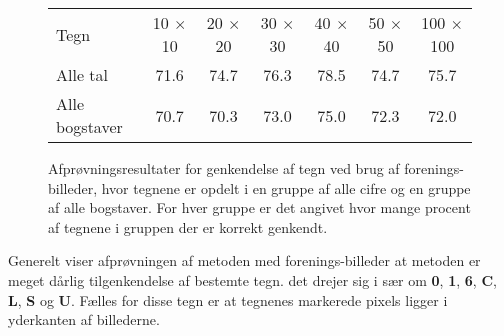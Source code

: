 \begin{figure}[htp]
\centering
\begin{tabular}{|l|c|c|c|c|c|c|}\hline
\rowcolor[gray]{0.9} \multicolumn{7}{|>{\columncolor[gray]{0.9}}c|}{\textbf{Forenings-billeder}} \\ \hline
Tegn & 10 $\times$ 10 & 20 $\times$ 20 & 30 $\times$ 30 & 40 $\times$ 40 & 50 $\times$ 50 & 100 $\times$ 100\\\hline
Alle tal & 71.6 & 74.7 & 76.3 & 78.5 & 74.7 & 75.7\\\hline
Alle bogstaver & 70.7 & 70.3 & 73.0 & 75.0 & 72.3 & 72.0\\\hline
\end{tabular}
\caption{Afprøvningsresultater for genkendelse af tegn ved brug af forenings-billeder, hvor tegnene er opdelt i en gruppe af alle cifre og en gruppe af alle bogstaver. For hver gruppe er det angivet hvor mange procent af tegnene i gruppen der er korrekt genkendt.}
\label{fig:test:and_alletegn}
\end{figure}

Generelt viser afprøvningen af metoden med forenings-billeder at metoden er meget dårlig tilgenkendelse af bestemte tegn. det drejer sig i sær om \textbf{0}, \textbf{1}, \textbf{6}, \textbf{C}, \textbf{L}, \textbf{S} og \textbf{U}. Fælles for disse tegn er at tegnenes markerede pixels ligger i yderkanten af billederne.


\begin{comment}

\begin{figure}[htp]
\centering
\begin{tabular}{|l|c|c|}\hline
\rowcolor[gray]{0.9} \multicolumn{3}{|>{\columncolor[gray]{0.9}}c|}{\textbf{Automatisk lokalisering}} \\ \hline
Sæt & Sammenhængende komponenter & Bjerg/dal \\\hline
Træningssæt & 0\% & 0\% \\\hline
Kontrolsæt & 0\% & 0\% \\\hline
\end{tabular}
\caption{Afprøvning af metoderne til separation af tegn på trænings- og kontrolsættet ved brug af automatisk lokalisering.}
\label{fig:test:sep-auto}
\end{figure}

\end{comment}

